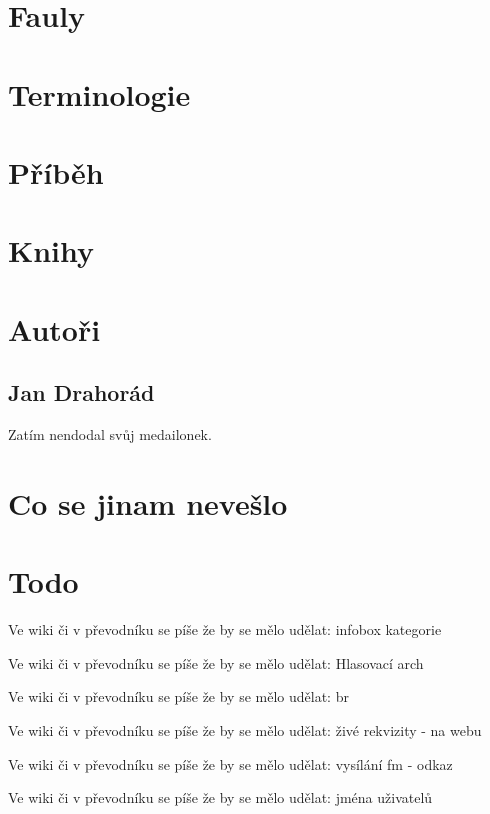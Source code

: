 \documentclass[a4paper,8pt]{book}
\newcommand{\todo}[1]{
Ve wiki či v převodníku se píše že by se mělo udělat: #1 
}
\begin{document}
\chapter{Fauly}\label{fauly}


\chapter{Terminologie}\label{terminologie}



\chapter{Příběh}\label{pribeh}


\chapter{Knihy}\label{knihy}



\chapter{Autoři}\label{autori}
\section{Jan Drahorád}
Zatím nendodal svůj medailonek.



\chapter{Co se jinam nevešlo}\label{co se jinam nevešlo}

\chapter{Todo}
\todo{infobox kategorie}
\todo{Hlasovací arch}
\todo{br}
\todo{živé rekvizity - na webu}
\todo{vysílání fm - odkaz}
\todo{jména uživatelů}
\setcounter{tocdepth}{1}
\tableofcontents
\end{document}
